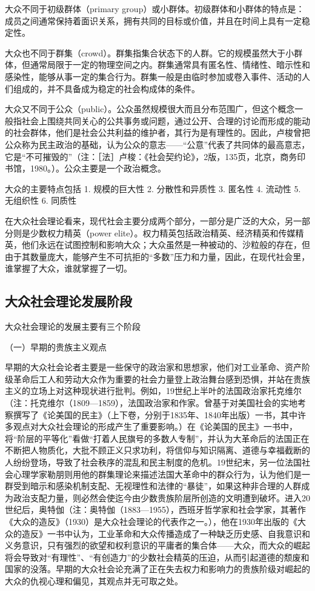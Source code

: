 \documentclass[UTF8,12pt]{ctexart}
\numberwithin{equation}{section} %
\numberwithin{figure}{section}
\numberwithin{table}{section}
\begin{document}
	大众不同于初级群体（primary group）或小群体。初级群体和小群体的特点是：成员之间通常保持着面识关系，拥有共同的目标或价值，并且在时间上具有一定稳定性。
	
	大众也不同于群集（crowd）。群集指集合状态下的人群。它的规模虽然大于小群体，但通常局限于一定的物理空间之内。群集通常具有匿名性、情绪性、暗示性和感染性，能够从事一定的集合行为。群集一般是由临时参加或卷入事件、活动的人们组成的，并不具备成为稳定的社会构成体的条件。
	
	大众又不同于公众（public）。公众虽然规模很大而且分布范围广，但这个概念一般指社会上围绕共同关心的公共事务或问题，通过公开、合理的讨论而形成的能动的社会群体，他们是社会公共利益的维护者，其行为是有理性的。因此，卢梭曾把公众称为民主政治的基础，认为公众的意志——“公意”代表了共同体的最高意志，它是“不可摧毁的”（注：［法］卢梭：《社会契约论》，2版，135页，北京，商务印书馆，1980。）。公众主要是一个政治概念。
	
	大众的主要特点包括
	1. 规模的巨大性
	2. 分散性和异质性
	3. 匿名性
	4. 流动性
	5. 无组织性
	6. 同质性
	
	在大众社会理论看来，现代社会主要分成两个部分，一部分是广泛的大众，另一部分则是少数权力精英（power elite）。权力精英包括政治精英、经济精英和传媒精英，他们永远在试图控制和影响大众；大众虽然是一种被动的、沙粒般的存在，但由于其数量庞大，能够产生不可抗拒的“多数”压力和力量，因此，在现代社会里，谁掌握了大众，谁就掌握了一切。
	
	\subsection{大众社会理论发展阶段}
	
	大众社会理论的发展主要有三个阶段
	
	（一）早期的贵族主义观点
	
	早期的大众社会论者主要是一些保守的政治家和思想家，他们对工业革命、资产阶级革命后工人和劳动大众作为重要的社会力量登上政治舞台感到恐惧，并站在贵族主义的立场上对这种现状进行批判。例如，19世纪上半叶的法国政治家托克维尔（注：托克维尔（1809—1859），法国政治家和作家。曾基于对美国社会的实地考察撰写了《论美国的民主》（上下卷，分别于1835年、1840年出版）一书，其中许多观点对大众社会理论的形成产生了重要影响。）在《论美国的民主》一书中，将“阶层的平等化”看做“打着人民旗号的多数人专制”，并认为大革命后的法国正在不断把人物质化，大批不顾正义只求功利，将信仰与知识隔离、道德与幸福截断的人纷纷登场，导致了社会秩序的混乱和民主制度的危机。19世纪末，另一位法国社会心理学家勒朋则用他的群集理论来描述法国大革命中的群众行为，认为他们是一群受到暗示和感染机制支配、无视理性和法律的“暴徒”，如果这种非合理的人群成为政治支配力量，则必然会使迄今由少数贵族阶层所创造的文明遭到破坏。进入20世纪后，奥特伽（注：奥特伽（1883—1955），西班牙哲学家和社会学家，其著作《大众的造反》（1930）是大众社会理论的代表作之一。），他在1930年出版的《大众的造反》一书中认为，工业革命和大众传播造成了一种缺乏历史感、自我意识和义务意识，只有强烈的欲望和权利意识的平庸者的集合体——大众，而大众的崛起将会导致对“有理性”、“有创造力”的少数社会精英的压迫，从而引起道德的颓废和国家的没落。早期的大众社会论充满了正在失去权力和影响力的贵族阶级对崛起的大众的仇视心理和偏见，其观点并无可取之处。
	
\end{document}
